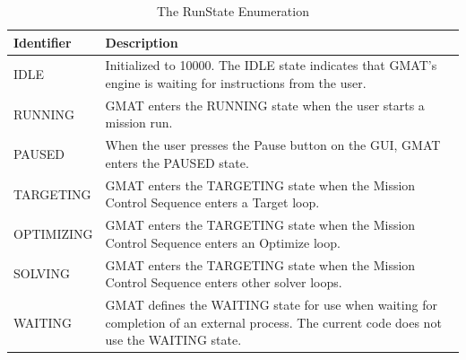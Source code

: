 \begin{table}[htb]
\begin{center}
\caption{\label{table:RunStateEnum}The RunState Enumeration}
\setlength\extrarowheight{2pt}
\begin{tabular}{|p{1.7in}|p{4in}|}
\hline
Identifier & Description \\
\hline
\hline
IDLE & Initialized to 10000.  The IDLE state indicates that GMAT's engine is waiting for
instructions from the user.\\
RUNNING & GMAT enters the RUNNING state when the user starts a mission run.\\
PAUSED & When the user presses the Pause button on the GUI, GMAT enters the PAUSED state.\\
TARGETING & GMAT enters the TARGETING state when the Mission Control Sequence enters a Target
loop.\\
OPTIMIZING & GMAT enters the TARGETING state when the Mission Control Sequence enters an Optimize
loop.\\
SOLVING & GMAT enters the TARGETING state when the Mission Control Sequence enters other solver
loops.\\
WAITING &  GMAT defines the WAITING state for use when waiting for completion of an external
process.  The current code does not use the WAITING state.\\
\hline
\end{tabular}
\end{center}
\end{table}


